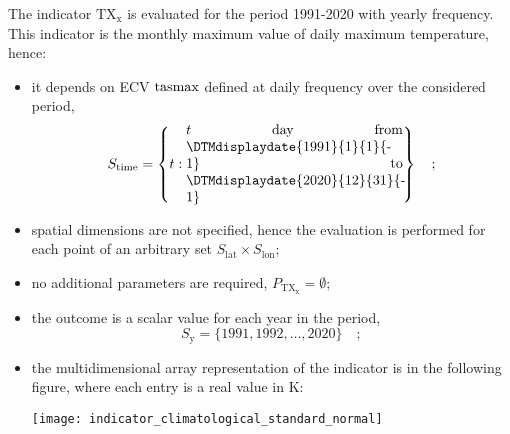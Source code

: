 \begin{example}
  The \gls{indicator} $\mathrm{TX_x}$ is evaluated for the period 1991-2020 with yearly frequency. This \gls{indicator} is the monthly maximum value of daily maximum temperature,\cite{ETCCDIClimate} hence:
  \begin{itemize}
    \item it depends on \gls{ECV} $\mathrm{tasmax}$ defined at daily frequency over the considered period,
      \begin{equation*}
        S_\text{time} = \left\{ t : \parbox{0.45\linewidth}{$t$ day from \DTMdisplaydate{1991}{1}{1}{-1} to \DTMdisplaydate{2020}{12}{31}{-1}} \right\}
        \quad ;
      \end{equation*}
    \item spatial dimensions are not specified, hence the evaluation is performed for each point of an arbitrary set $S_\text{lat} \times S_\text{lon}$;
    \item no additional parameters are required, $P_\mathrm{TX_x} = \emptyset$;
    \item the outcome is a scalar value for each year in the period,
      \begin{equation*}
        S_\text{y} = \{ 1991, 1992, \dots, 2020 \}
        \quad ;
      \end{equation*}
    \item the multidimensional array representation of the \gls{indicator} is in the following figure, where each entry is a real value in \unit{\kelvin}:
      \begin{center}
        \texttt{[image: indicator\_climatological\_standard\_normal]}
      \end{center}
  \end{itemize}
\end{example}
